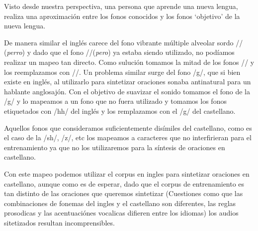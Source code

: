 Visto desde nuestra perspectiva, una persona que aprende una nueva lengua, realiza una aproximación entre los fonos conocidos y los fonos `objetivo' de la nueva lengua.

De manera similar el inglés carece del fono vibrante múltiple alveolar sordo // (\textit{perro}) y dado que el fono //(\textit{pero})  ya estaba siendo utilizado, no podíamos realizar un mapeo tan directo. Como sulución tomamos la mitad de los fonos // y los reemplazamos con //. Un problema similar surge del fono /g/, que si bien existe en inglés, al utilizarlo para sintetizar oraciones sonaba antinatural para un hablante anglosajón. Con el objetivo de suavizar el sonido tomamos el fono de la /g/ y lo mapeamos a un fono que no fuera utilizado y tomamos los fonos etiquetados con /hh/ del inglés y los remplazamos con el /g/ del castellano.

Aquellos fonos que consideramos suficientemente disímiles del castellano, como es el caso de la /sh/, /z/, etc los mapeamos a caracteres que no interfirieran para el entrenamiento ya que no los utilizaremos para la síntesis de oraciones en castellano.

Con este mapeo podemos utilizar el corpus en ingles para sintetizar oraciones en castellano, aunque como es de esperar, dado que el corpus de entrenamiento es tan distinto de las oraciones que queremos sintetizar (Cuestiones como que las combinaciones de fonemas del ingles y el castellano son diferentes, las reglas prosodicas y las acentuaciónes vocalicas difieren entre los idiomas) los audios sitetizados resultan incomprensibles.

